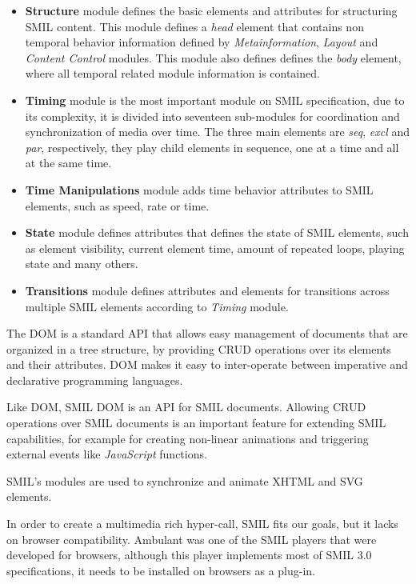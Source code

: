 \begin{itemize}
  \item \textbf{Structure} module defines the basic elements and attributes for structuring \ac{SMIL} content. This module defines a \emph{head} element that contains non temporal behavior information defined by  \emph{Metainformation}, \emph{Layout} and \emph{Content Control} modules. This module also defines defines the \emph{body} element, where all temporal related module information is contained.

  \item \textbf{Timing} module is the most important module on \ac{SMIL} specification, due to its complexity, it is divided into seventeen sub-modules for coordination and synchronization of media over time. The three main elements are \emph{seq}, \emph{excl} and \emph{par}, respectively, they play child elements in sequence, one at a time and all at the same time. 

  \item \textbf{Time Manipulations} module adds time behavior attributes to \ac{SMIL} elements, such as speed, rate or time.

  \item \textbf{State} module defines attributes that defines the state of \ac{SMIL} elements, such as element visibility, current element time, amount of repeated loops, playing state and many others.

  \item \textbf{Transitions} module defines attributes and elements for transitions across multiple \ac{SMIL} elements according to \emph{Timing} module.

\end{itemize}

The \ac{DOM} is a standard \ac{API} that allows easy management of documents that are organized in a tree structure, by providing \ac{CRUD} operations over its elements and their attributes. \ac{DOM} makes it easy to inter-operate between imperative and declarative programming languages.
  
Like \ac{DOM}, \ac{SMIL} \ac{DOM} is an \ac{API} for \ac{SMIL} documents. Allowing \ac{CRUD} operations over \ac{SMIL} documents is an important feature for extending \ac{SMIL} capabilities, for example for creating non-linear animations and triggering external events like \emph{JavaScript} functions.  


  \ac{SMIL}'s modules are used to synchronize and animate \ac{XHTML} and \ac{SVG} elements.

  In order to create a multimedia rich hyper-call, \ac{SMIL} fits our goals, but it lacks on browser compatibility. Ambulant \cite{ambulant} was one of the SMIL players that were developed for browsers, although this player implements most of \ac{SMIL} 3.0 \cite{smil3} specifications, it needs to be installed on browsers as a plug-in.

